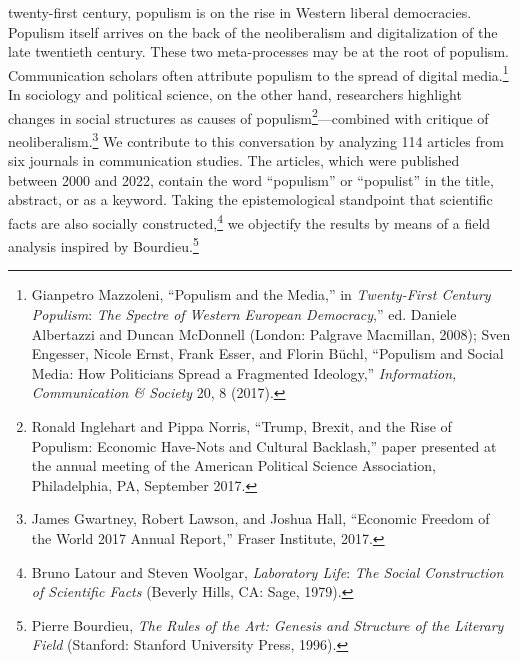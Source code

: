 \documentclass{tufte-handout}
\begin{document}
 twenty-first century, populism is on the rise in Western
liberal democracies. Populism itself arrives on the back of the
neoliberalism and digitalization of the late twentieth century. These
two meta-processes may be at the root of populism. Communication
scholars often attribute populism to the spread of digital
media.\footnote{Gianpetro Mazzoleni, ``Populism and the Media,'' in
  \emph{Twenty-First Century Populism}: \emph{The Spectre of Western
  European Democracy},'' ed. Daniele Albertazzi and Duncan McDonnell
  (London: Palgrave Macmillan, 2008); Sven Engesser, Nicole Ernst, Frank
  Esser, and Florin Büchl, ``Populism and Social Media: How Politicians
  Spread a Fragmented Ideology,'' \emph{Information, Communication \&
  Society} 20, 8 (2017).} In sociology and political science, on the
other hand, researchers highlight changes in social structures as causes
of populism\footnote{Ronald Inglehart and Pippa Norris, ``Trump, Brexit,
  and the Rise of Populism: Economic Have-Nots and Cultural Backlash,''
  paper presented at the annual meeting of the American Political
  Science Association, Philadelphia, PA, September 2017.}---combined
with critique of neoliberalism.\footnote{James Gwartney, Robert Lawson,
  and Joshua Hall, ``Economic Freedom of the World 2017 Annual Report,''
  Fraser Institute, 2017.} We contribute to this conversation by
analyzing 114 articles from six journals in communication studies. The
articles, which were published between 2000 and 2022, contain the word
``populism'' or ``populist'' in the title, abstract, or as a keyword.
Taking the epistemological standpoint that scientific facts are also
socially constructed,\footnote{Bruno Latour and Steven Woolgar,
  \emph{Laboratory Life}: \emph{The Social Construction of Scientific
  Facts} (Beverly Hills, CA: Sage, 1979).} we objectify the results by
means of a field analysis inspired by Bourdieu.\footnote{Pierre
  Bourdieu, \emph{The Rules of the Art: Genesis and Structure of the
  Literary Field} (Stanford: Stanford University Press, 1996).}
\end{document}
